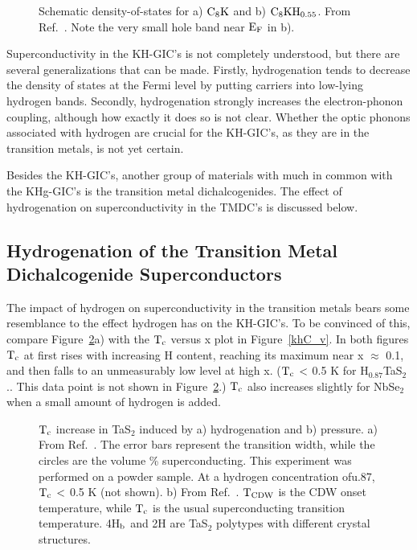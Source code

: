 \begin{figure}
\vspace{16cm}
\caption[Schematic density-of-states for $\rm C_8K$ before and after
hydrogenation]{Schematic density-of-states for  a) $\rm  C_8K$ and b)  $\rm
C_8KH_{0.55}$.  From Ref.~\cite{miyajima88}.  Note the very small  hole band
near $\rm E_F$ in b).}
\label{khdos}
\end{figure}

        Superconductivity in the KH-GIC's is not completely understood, but
there are several generalizations that can be made.  Firstly, hydrogenation
tends   to decrease the   density of states at  the  Fermi level by putting
carriers into low-lying hydrogen bands.   Secondly,  hydrogenation strongly
increases the electron-phonon coupling, although how  exactly it does so is
not clear.  Whether the optic phonons associated  with hydrogen are crucial
for the KH-GIC's, as they are in the transition metals, is not yet certain.

        Besides the  KH-GIC's,   another group of  materials  with  much in
common  with  the KHg-GIC's is  the transition metal  dichalcogenides.  The
effect of  hydrogenation on superconductivity   in the TMDC's  is discussed
below.
 

\subsection{Hydrogenation of the Transition Metal Dichalcogenide Superconductors}
\label{hydtmdc}

        The impact  of   hydrogen on  superconductivity   in the transition
metals bears some  resemblance to the effect  hydrogen has on the KH-GIC's.
To be convinced of this, compare Figure~\ref{tmdcHfig}a) with the $\rm T_c$
versus x plot  in Figure~\ref{khC_v}.  In  both figures $\rm T_c$  at first
rises with increasing H content, reaching its maximum near x $\approx$ 0.1,
and then falls to an unmeasurably low level at high x.  ($\rm T_c \, <$ 0.5
K for H$_{0.87}$TaS$_2$.\cite{murphy75}.   This data point is  not shown in
Figure~\ref{tmdcHfig}.)  $\rm T_c$  also  increases slightly   for NbSe$_2$
when a small amount of hydrogen is added.\cite{murphy75}

\begin{figure}
\vspace{18cm}
\caption[$\rm T_c$ increase in TaS$_2$ induced by hydrogenation and
pressure]{$\rm T_c$ increase in TaS$_2$ induced by a) hydrogenation and b)
pressure.  a) From Ref.~\cite{murphy75}. The error bars represent the
transition width, while the circles are the volume \% superconducting.
This experiment was performed on a powder sample. At a hydrogen
concentration ofu.87, $\rm T_c \, <$ 0.5 K (not shown).  b) From
Ref.~\cite{friend79}.  $\rm T_{CDW}$ is the CDW onset temperature, while
$\rm T_c$ is the usual superconducting transition temperature.  4H$\rm
_{b}$ and 2H are TaS$_2$ polytypes with different crystal structures.}
\label{tmdcHfig}
\end{figure}

